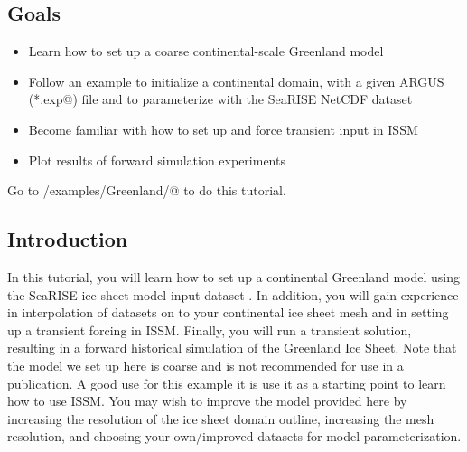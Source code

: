 \subsection{Goals} %
\begin{itemize}
	\item Learn how to set up a coarse continental-scale Greenland model
	\item Follow an example to initialize a continental domain, with a given ARGUS (\verb@*.exp@) file and to parameterize with the SeaRISE NetCDF dataset
	\item Become familiar with how to set up and force transient input in ISSM
	\item Plot results of forward simulation experiments
\end{itemize}
Go to \verb@trunk/examples/Greenland/@ to do this tutorial.
\subsection{Introduction}%
In this tutorial, you will learn how to set up a continental Greenland model using the SeaRISE ice sheet model input dataset \citep{Nowicki2013a}. In addition, you will gain experience in interpolation of datasets on to your continental ice sheet mesh and in setting up a transient forcing in ISSM. Finally, you will run a transient solution, resulting in a forward historical simulation of the Greenland Ice Sheet. Note that the model we set up here is coarse and is not recommended for use in a publication. A good use for this example it is use it as a starting point to learn how to use ISSM. You may wish to improve the model provided here by increasing the resolution of the ice sheet domain outline, increasing the mesh resolution, and choosing your own/improved datasets for model parameterization.

